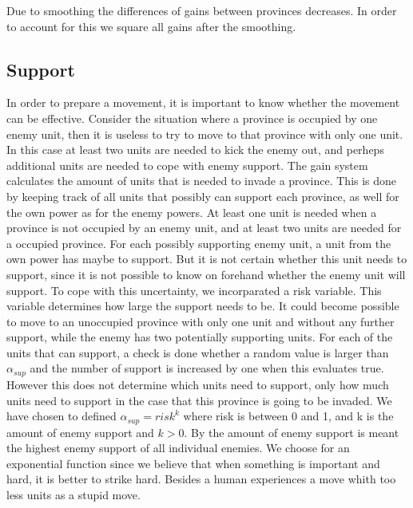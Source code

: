 \documentclass[a4paper]{article} %
\begin{document}
Due to smoothing the differences of gains between provinces decreases. In order to account for this we square all gains after the smoothing. 


\subsection{Support}

In order to prepare a movement, it is important to know whether the movement can be effective. Consider the situation where a province is occupied by one enemy unit, then it is useless to try to move to that province with only one unit. In this case at least two units are needed to kick the enemy out, and perheps additional units are needed to cope with enemy support. The gain system calculates the amount of units that is needed to invade a province. This is done by keeping track of all units that possibly can support each province, as well for the own power as for the enemy powers. At least one unit is needed when a province is not occupied by an enemy unit, and at least two units are needed for a occupied province. For each possibly supporting enemy unit, a unit from the own power has maybe to support. But it is not certain whether this unit needs to support, since it is not possible to know on forehand whether the enemy unit will support. To cope with this uncertainty, we incorparated a risk variable. This variable determines how large the support needs to be. It could become possible to move to an unoccupied province with only one unit and without any further support, while the enemy has two potentially supporting units. For each of the units that can support, a check is done whether a random value is larger than $\alpha_{sup}$ and the number of support is increased by one when this evaluates true. However this does not determine which units need to support, only how much units need to support in the case that this province is going to be invaded. We have chosen to defined $\alpha_{sup} = risk^{k}$ where risk is between 0 and 1, and k is the amount of enemy support and $k>0$. By the amount of enemy support is meant the highest enemy support of all individual enemies. We choose for an exponential function since we believe that when something is important and hard, it is better to strike hard. Besides a human experiences a move whith too less units as a stupid move. 
\end{document}

